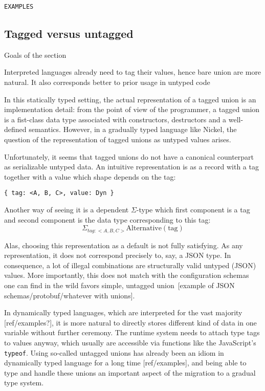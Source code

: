 \documentclass{article}
\begin{document}
\begin{verbatim}
EXAMPLES
\end{verbatim}

\subsection{Tagged versus untagged}
\color{red}Goals of the section

Interpreted languages already need to tag their values, hence bare union are more natural.
It also corresponds better to prior usage in untyped code\vspace{0.5cm}\color{black}

In this statically typed setting, the actual representation of a tagged union is
an implementation detail: from the point of view of the programmer, a tagged
union is a fist-class data type associated with constructors, destructors and a
well-defined semantics.  However, in a gradually typed language like Nickel, the
question of the representation of tagged unions as untyped values arises.

Unfortunately, it seems that tagged unions do not have a canonical counterpart
as serializable untyped data. An intuitive representation is as a record with a
tag together with a value which shape depends on the tag:

\begin{lstlisting}
{ tag: <A, B, C>, value: Dyn }
\end{lstlisting}

Another way of seeing it is a dependent $\Sigma$-type which first component is a
tag and second component is the data type corresponding to this tag:
\[
    \Sigma_{tag : <A, B, C>} \text{Alternative}(\text{tag})
\]

Alas, choosing this representation as a default is not fully satisfying. As any
representation, it does not correspond precisely to, say, a JSON type. In
consequence, a lot of illegal combinations are structurally valid untyped (JSON)
values. More importantly, this does not match with the configuration schemas one
can find in the wild favors simple, untagged union [example of JSON
schemas/protobuf/whatever with unions].

In dynamically typed languages, which are interpreted for the vast majority
[ref/examples?], it is more natural to directly stores different kind of data in
one variable without further ceremony. The runtime system needs to attach type
tags to values anyway, which usually are accessible via functions like the
JavaScript's \verb+typeof+. Using so-called untagged unions has already been an
idiom in dynamically typed language for a long time [ref/examples], and being
able to type and handle these unions an important aspect of the migration to a
gradual type system.
\end{document}
